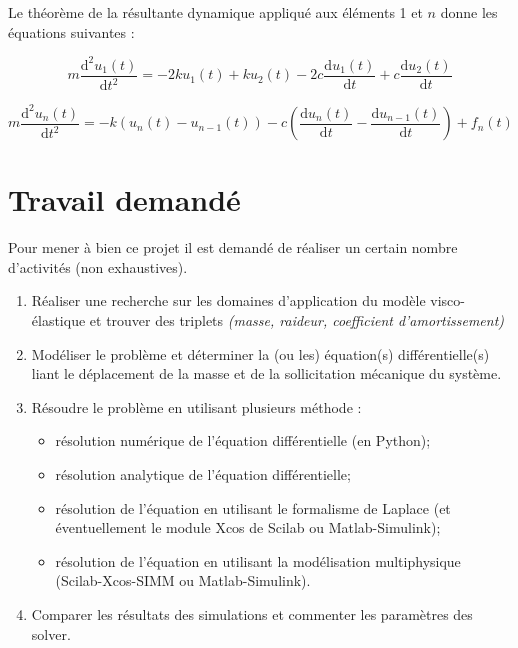 \documentclass[10pt,fleqn]{article} %
\begin{document}
\begin{multicols}{2}
Le théorème de la résultante dynamique appliqué aux éléments 1 et $n$ donne les équations suivantes : 
%


\begin{equation}
m\dfrac{\text{d}^2u_1(t)}{\text{d}t^2} = 
- 2k u_1(t) + k u_2 (t) 
-2c \dfrac{\text{d}u_1(t)}{\text{d}t} 
+ c \dfrac{\text{d}u_2(t)}{\text{d}t} 
\end{equation}

\begin{equation}
m\dfrac{\text{d}^2u_n(t)}{\text{d}t^2} = 
-k\left(u_n(t)-u_{n-1}(t) \right)   - c\left(\dfrac{\text{d}u_{n}(t)}{\text{d}t}-\dfrac{\text{d}u_{n-1}(t)}{\text{d}t} \right) +f_n(t)
\end{equation}


\begin{minipage}[c]{.77\linewidth}


\begin{obj}

\end{obj}
\end{minipage} \hfill
\begin{minipage}[c]{.2\linewidth}

\end{minipage}

\section{Travail demandé}
Pour mener à bien ce projet il est demandé de réaliser un certain nombre d'activités (non exhaustives).
\begin{enumerate}
\item Réaliser une recherche sur les domaines d'application du modèle visco-élastique et trouver des triplets \textit{(masse, raideur, coefficient d'amortissement)}
\item Modéliser le problème et déterminer la (ou les) équation(s) différentielle(s) liant le déplacement de la masse et de la sollicitation mécanique du système.
\item Résoudre le problème en utilisant plusieurs méthode : 
\begin{itemize}
\item résolution numérique de l'équation différentielle (en Python);
\item résolution analytique de l'équation différentielle;
\item résolution de l'équation en utilisant le formalisme de Laplace (et éventuellement le module Xcos de Scilab ou Matlab-Simulink);
\item résolution de l'équation en utilisant la modélisation multiphysique (Scilab-Xcos-SIMM ou Matlab-Simulink).
\end{itemize}
\item Comparer les résultats des simulations et commenter les paramètres des solver.
\end{enumerate}


\end{multicols}
\end{document}
